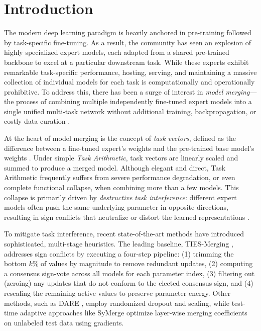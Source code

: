 \section{Introduction}
\label{submission:intro}

The modern deep learning paradigm is heavily anchored in pre-training followed by task-specific fine-tuning.
As a result, the community has seen an explosion of highly specialized expert models, each adapted from a shared pre-trained backbone to excel at a particular downstream task.
While these experts exhibit remarkable task-specific performance, hosting, serving, and maintaining a massive collection of individual models for each task is computationally and operationally prohibitive.
To address this, there has been a surge of interest in \emph{model merging}---the process of combining multiple independently fine-tuned expert models into a single unified multi-task network without additional training, backpropagation, or costly data curation \cite{wortsman2022robust, ilharco2022editing, yadav2023ties}.

At the heart of model merging is the concept of \emph{task vectors}, defined as the difference between a fine-tuned expert's weights and the pre-trained base model's weights \cite{ilharco2022editing}.
Under simple \emph{Task Arithmetic}, task vectors are linearly scaled and summed to produce a merged model.
Although elegant and direct, Task Arithmetic frequently suffers from severe performance degradation, or even complete functional collapse, when combining more than a few models.
This collapse is primarily driven by \emph{destructive task interference}: different expert models often push the same underlying parameter in opposite directions, resulting in sign conflicts that neutralize or distort the learned representations \cite{yadav2023ties}.

To mitigate task interference, recent state-of-the-art methods have introduced sophisticated, multi-stage heuristics.
The leading baseline, \mbox{TIES-Merging} \cite{yadav2023ties}, addresses sign conflicts by executing a four-step pipeline: (1) trimming the bottom $k\%$ of values by magnitude to remove redundant updates, (2) computing a consensus sign-vote across all models for each parameter index, (3) filtering out (zeroing) any updates that do not conform to the elected consensus sign, and (4) rescaling the remaining active values to preserve parameter energy.
Other methods, such as \mbox{DARE} \cite{yu2024dare}, employ randomized dropout and scaling, while test-time adaptive approaches like \mbox{SyMerge} \cite{yang2024symerge} optimize layer-wise merging coefficients on unlabeled test data using gradients.

